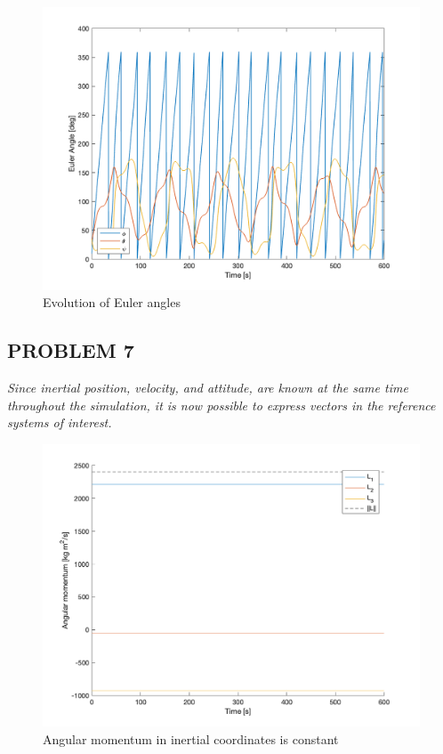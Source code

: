 \begin{figure}[H]
\centering
\includegraphics[scale=0.6]{Images/ps3_problem6_euler.png}
\caption{Evolution of Euler angles}
\label{fig:ps3_problem6_euler}
\end{figure}

\subsection{PROBLEM 7}
\textit{Since inertial position, velocity, and attitude, are known at the same time throughout the simulation, it is now possible to express vectors in the reference systems of interest.}

\begin{figure}[H]
\centering
\includegraphics[scale=0.6]{Images/ps3_problem7a.png}
\caption{Angular momentum in inertial coordinates is constant}
\label{fig:ps3_problem7a}
\end{figure}

